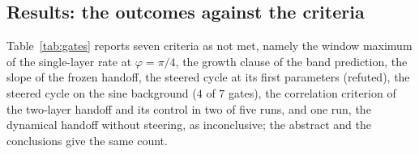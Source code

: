 \documentclass[11pt]{article}
\theoremstyle{remark}
\begin{document}
\subsection{Results: the outcomes against the criteria}

Table~\ref{tab:gates} reports seven criteria as not met, namely the window maximum of the single-layer rate at
$\varphi=\pi/4$, the growth clause of the band prediction, the slope of the frozen handoff, the steered cycle at its first
parameters (refuted), the steered cycle on the sine background ($4$ of $7$ gates), the correlation criterion of the
two-layer handoff and its control in two of five runs, and one run, the dynamical handoff without steering, as
inconclusive; the abstract and the conclusions give the same count.

\begingroup\footnotesize
\setlength{\tabcolsep}{3pt}
\end{document}

